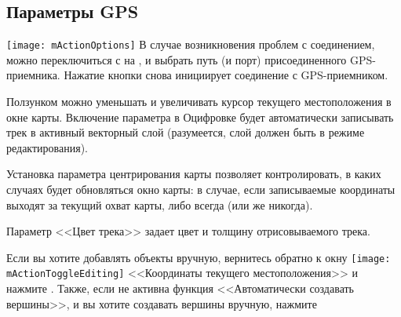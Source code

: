 \subsection{Параметры GPS}
\texttt{[image: mActionOptions]} В случае
возникновения проблем с соединением, можно переключиться с
 на
, и выбрать путь (и порт)
присоединенного GPS-приемника. Нажатие кнопки 
снова инициирует соединение с GPS-приемником.

Ползунком  можно уменьшать и увеличивать курсор
текущего местоположения в окне карты. Включение параметра
 в Оцифровке будет
автоматически записывать трек в активный векторный слой (разумеется,
слой должен быть в режиме редактирования).

Установка параметра центрирования карты позволяет контролировать, в каких
случаях будет обновляться окно карты: в случае, если записываемые
координаты выходят за текущий охват карты, либо всегда (или же никогда).

Параметр <<Цвет трека>> задает цвет и толщину отрисовываемого трека.

Если вы хотите добавлять объекты вручную, вернитесь обратно к окну
\texttt{[image: mActionToggleEditing]} <<Координаты
текущего местоположения>> и нажмите . Также, если
не активна функция <<Автоматически создавать вершины>>, и вы хотите создавать
вершины вручную, нажмите 

\FloatBarrier
